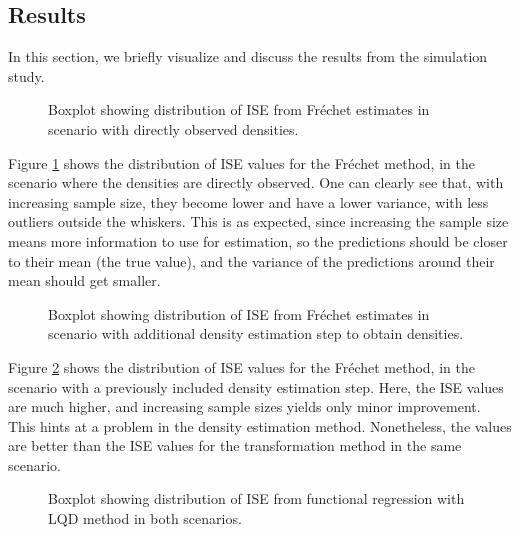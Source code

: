 \subsection{Results}
\label{sec:app_results}
In this section, we briefly visualize and discuss the results from the simulation study.

\begin{figure}[h!]
    \centering
    \resizebox{1\textwidth}{!}{}
    \caption[Simulation results: ISE boxplot --- Fréchet method with observed densities]{Boxplot showing distribution of
    ISE from Fréchet estimates in scenario with directly observed densities.}
    \label{fig:ise_frechet}
\end{figure}

Figure \ref{fig:ise_frechet} shows the distribution of ISE values for the Fréchet method,
in the scenario where the densities are directly observed. One can clearly see that, with
increasing sample size, they become lower and have a lower variance, with less outliers
outside the whiskers. This is as expected, since increasing the sample size
means more information to use for estimation, so the predictions should be closer to
their mean (the true value), and the variance of the predictions around their mean should
get smaller.

\begin{figure}[h!]
    \centering
    \resizebox{1\textwidth}{!}{}
    \caption[Simulation results: ISE boxplot --- Fréchet method with estimated densities]{Boxplot
    showing distribution of ISE from Fréchet estimates in scenario with additional
    density estimation step to obtain densities.}
    \label{fig:ise_frechet_denstimation}
\end{figure}

Figure \ref{fig:ise_frechet_denstimation} shows the distribution of ISE values for
the Fréchet method, in the scenario with a previously included density estimation step.
Here, the ISE values are much higher, and increasing sample sizes yields only minor
improvement. This hints at a problem in the density estimation method. Nonetheless,
the values are better than the ISE values for the transformation method in the same
scenario.

\begin{figure}[h!]
    \centering
    \resizebox{\textwidth}{!}{}
    \caption[Simulation results: ISE boxplot --- functional regression]{Boxplot showing
    distribution of ISE from functional regression with LQD method in both scenarios.}
    \label{fig:ise_func_reg_both}
\end{figure}

